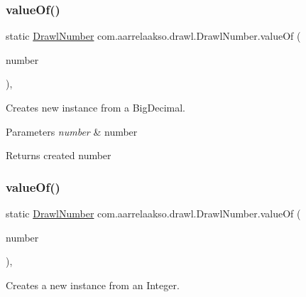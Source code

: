 \subsubsection{\texorpdfstring{value\+Of()}{valueOf()}\hspace{0.1cm}{\footnotesize\ttfamily [3/5]}}
{\footnotesize\ttfamily static \hyperlink{classcom_1_1aarrelaakso_1_1drawl_1_1_drawl_number}{Drawl\+Number} com.\+aarrelaakso.\+drawl.\+Drawl\+Number.\+value\+Of (\begin{DoxyParamCaption}\item[{@Not\+Null final Big\+Decimal}]{number }\end{DoxyParamCaption})\hspace{0.3cm}{\ttfamily [static]}, {\ttfamily [package]}}



Creates new instance from a Big\+Decimal. 


\begin{DoxyParams}{Parameters}
{\em number} & number \\
\hline
\end{DoxyParams}
\begin{DoxyReturn}{Returns}
created number 
\end{DoxyReturn}
\mbox{\label{classcom_1_1aarrelaakso_1_1drawl_1_1_drawl_number_ade5aafecf2503e46fd21366d57eef286}} 
\subsubsection{\texorpdfstring{value\+Of()}{valueOf()}\hspace{0.1cm}{\footnotesize\ttfamily [4/5]}}
{\footnotesize\ttfamily static \hyperlink{classcom_1_1aarrelaakso_1_1drawl_1_1_drawl_number}{Drawl\+Number} com.\+aarrelaakso.\+drawl.\+Drawl\+Number.\+value\+Of (\begin{DoxyParamCaption}\item[{@Not\+Null final Integer}]{number }\end{DoxyParamCaption})\hspace{0.3cm}{\ttfamily [static]}, {\ttfamily [package]}}



Creates a new instance from an Integer. 


